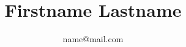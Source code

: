 \documentclass[10pt]{article}
\title{\bfseries\Huge Firstname Lastname}
\author{name@mail.com}
\date{}
\begin{document}
	\begin{minipage}{0.65\textwidth}
	\begingroup
		\let\center\flushleft
		\let\endcenter\endflushleft
		\maketitle
	\endgroup
	\end{minipage}
	
	\begin{minipage}{0.3\textwidth}
		\flushright{\rule{3.5cm}{4.5cm}}
	\end{minipage}
\end{document}
